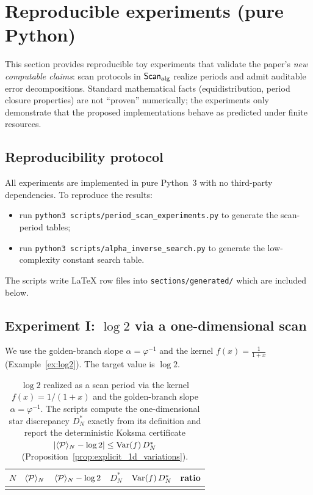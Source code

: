 
\section{Reproducible experiments (pure Python)}
\label{sec:experiments}

This section provides reproducible toy experiments that validate the paper's \emph{new computable claims}: scan protocols in $\mathsf{Scan}_{\mathrm{alg}}$ realize periods and admit auditable error decompositions. Standard mathematical facts (equidistribution, period closure properties) are not ``proven'' numerically; the experiments only demonstrate that the proposed implementations behave as predicted under finite resources.

\subsection{Reproducibility protocol}
\label{sec:reproducibility_protocol}

All experiments are implemented in pure Python~3 with no third-party dependencies. To reproduce the results:
\begin{itemize}
\item run \texttt{python3 scripts/period\_scan\_experiments.py} to generate the scan-period tables;
\item run \texttt{python3 scripts/alpha\_inverse\_search.py} to generate the low-complexity constant search table.
\end{itemize}
The scripts write \LaTeX{} row files into \texttt{sections/generated/} which are included below.

\subsection{Experiment I: \texorpdfstring{$\log 2$}{log 2} via a one-dimensional scan}
\label{sec:exp_log2}

We use the golden-branch slope $\alpha=\varphi^{-1}$ and the kernel $f(x)=\frac{1}{1+x}$ (Example~\ref{ex:log2}). The target value is $\log 2$.

\begin{table}[t]
\centering
\begin{tabular}{@{}rrrrrr@{}}
\toprule
$N$ & $\langle \mathcal{P} \rangle_N$ & $\langle \mathcal{P} \rangle_N-\log 2$ & $D_N^\ast$ & $\mathrm{Var}(f)\,D_N^\ast$ & ratio \\
\midrule

\\
\bottomrule
\end{tabular}
\caption{$\log 2$ realized as a scan period via the kernel $f(x)=1/(1+x)$ and the golden-branch slope $\alpha=\varphi^{-1}$. The scripts compute the one-dimensional star discrepancy $D_N^\ast$ exactly from its definition and report the deterministic Koksma certificate $|\langle \mathcal{P} \rangle_N-\log 2|\le \mathrm{Var}(f)\,D_N^\ast$ (Proposition~\ref{prop:explicit_1d_variations}).}
\label{tab:log2_scan}
\end{table}

